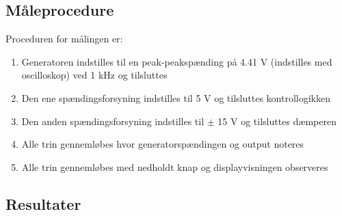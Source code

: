 \subsection*{Måleprocedure}
Proceduren for målingen er:

\begin{enumerate}
\item Generatoren indstilles til en peak-peakspænding på 4.41 V (indstilles med oscilloskop) ved 1 kHz og tilsluttes
\item Den ene spændingsforsyning indstilles til 5 V og tilsluttes kontrollogikken
\item Den anden spændingsforsyning indstilles til $\pm$ 15 V og tilsluttes dæmperen
\item Alle trin gennemløbes hvor generatorspændingen og output noteres
\item Alle trin gennemløbes med nedholdt knap og displayvisningen observeres
\end{enumerate}

\subsection*{Resultater}

